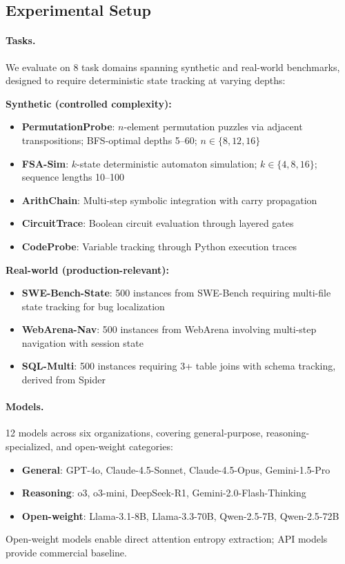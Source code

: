 \documentclass{article}
\theoremstyle{plain}
\theoremstyle{definition}
\theoremstyle{remark}
\begin{document}
\subsection{Experimental Setup}

\paragraph{Tasks.} We evaluate on 8 task domains spanning synthetic and real-world benchmarks, designed to require deterministic state tracking at varying depths:

\textbf{Synthetic (controlled complexity):}
\begin{itemize}[leftmargin=*,itemsep=0pt]
\item \textbf{PermutationProbe}: $n$-element permutation puzzles via adjacent transpositions; BFS-optimal depths 5--60; $n \in \{8, 12, 16\}$
\item \textbf{FSA-Sim}: $k$-state deterministic automaton simulation; $k \in \{4, 8, 16\}$; sequence lengths 10--100
\item \textbf{ArithChain}: Multi-step symbolic integration with carry propagation
\item \textbf{CircuitTrace}: Boolean circuit evaluation through layered gates
\item \textbf{CodeProbe}: Variable tracking through Python execution traces
\end{itemize}

\textbf{Real-world (production-relevant):}
\begin{itemize}[leftmargin=*,itemsep=0pt]
\item \textbf{SWE-Bench-State}: 500 instances from SWE-Bench \citep{jimenez2024swebench} requiring multi-file state tracking for bug localization
\item \textbf{WebArena-Nav}: 500 instances from WebArena \citep{zhou2024webarena} involving multi-step navigation with session state
\item \textbf{SQL-Multi}: 500 instances requiring 3+ table joins with schema tracking, derived from Spider \citep{yu2018spider}
\end{itemize}

\paragraph{Models.} 12 models across six organizations, covering general-purpose, reasoning-specialized, and open-weight categories:
\begin{itemize}[leftmargin=*,itemsep=0pt]
\item \textbf{General}: GPT-4o, Claude-4.5-Sonnet, Claude-4.5-Opus, Gemini-1.5-Pro
\item \textbf{Reasoning}: o3, o3-mini, DeepSeek-R1, Gemini-2.0-Flash-Thinking
\item \textbf{Open-weight}: Llama-3.1-8B, Llama-3.3-70B, Qwen-2.5-7B, Qwen-2.5-72B
\end{itemize}
Open-weight models enable direct attention entropy extraction; API models provide commercial baseline.
\end{document}
